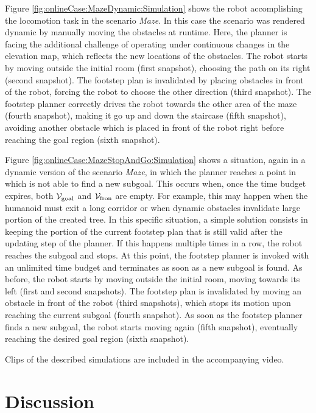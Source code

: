 Figure \ref{fig:onlineCase:MazeDynamic:Simulation} shows the robot accomplishing the locomotion task in the scenario \textit{Maze}. In this case the scenario was rendered dynamic by manually moving the obstacles at runtime. Here, the planner is facing the additional challenge of operating under continuous changes in the elevation map, which reflects the new locations of the obstacles. The robot starts by moving outside the initial room (first snapshot), choosing the path on its right (second snapshot). The footstep plan is invalidated by placing obstacles in front of the robot, forcing the robot to choose the other direction (third snapshot). The footstep planner correctly drives the robot towards the other area of the maze (fourth snapshot), making it go up and down the staircase (fifth snapshot), avoiding another obstacle which is placed in front of the robot right before reaching the goal region (sixth snapshot).

Figure \ref{fig:onlineCase:MazeStopAndGo:Simulation} shows a situation, again in a dynamic version of the scenario \textit{Maze}, in which the planner reaches a point in which is not able to find a new subgoal. This occurs when, once the time budget expires, both $\mathcal{V}_{\rm goal}$ and $\mathcal{V}_{\rm fron}$ are empty.
For example, this may happen when the humanoid must exit a long corridor or when dynamic obstacles invalidate large portion of the created tree.
In this specific situation, a simple solution consists in keeping the portion of the current footstep plan that is still valid after the updating step of the planner. 
If this happens multiple times in a row, the robot reaches the subgoal and stops. At this point, the footstep planner is invoked with an unlimited time budget and terminates as soon as a new subgoal is found. As before, the robot starts by moving outside the initial room, moving towards its left (first and second snapshots). The footstep plan is invalidated by moving an obstacle in front of the robot (third snapshots), which stops its motion upon reaching the current subgoal (fourth snapshot). As soon as the footstep planner finds a new subgoal, the robot starts moving again (fifth snapshot), eventually reaching the desired goal region (sixth snapshot).

Clips of the described simulations are included in the accompanying video.%


\section{Discussion}
\label{sec:discussion}

